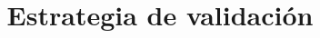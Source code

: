 \documentclass[12pt,letterpaper]{report}
\begin{document}
\renewcommand{\listtablename}{Índice de tablas}
\renewcommand{\tablename}{Tabla}
    \title{\textbf{Estrategia de validación}}
    \author{\textbf{}}


\beforepreface



\newpage
\afterpreface



 





%
%
%
\end{document}
